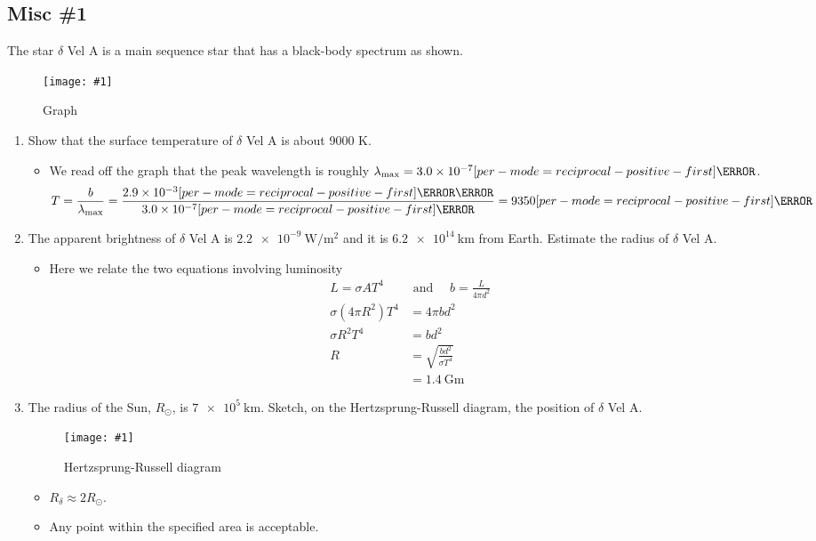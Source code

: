 \documentclass[a4paper,12pt]{article}
\let\oldsi\si
\renewcommand{\si}[1]{\oldsi[per-mode=reciprocal-positive-first]{#1}}
\newcommand{\img}[4]{\begin{center}
  \begin{figure}[H]
    \centering
    \texttt{[image: \#1]}
    \caption{#3}
    \label{fig:#4}
  \end{figure}
\end{center}}
\begin{document}
\pagebreak

\subsection{Misc \#1}

The star $\delta$ Vel A is a main sequence star that has a black-body spectrum as shown.

\img{ex/3.png}{0.9}{Graph}{ex3}

\begin{enumerate}[label=(\alph*)]
  \item Show that the surface temperature of $\delta$ Vel A is about 9000 K.
        \begin{itemize}
          \item We read off the graph that the peak wavelength is roughly $\lambda_{\max} = 3.0 \times 10^{-7} \si{\m}$.
                \begin{align*}
                  T = \frac{b}{\lambda_{\max}} = \frac{2.9 \times 10^{-3} \si{\m\kelvin}}{3.0 \times 10^{-7} \si{\m}} = 9350 \si{\kelvin}
                \end{align*}
        \end{itemize}
  \item The apparent brightness of $\delta$ Vel A is $\SI{2.2e-9}{\W\per\m\squared}$ and it is $\SI{6.2e14}{\km}$ from Earth. Estimate the radius of $\delta$ Vel A.

        \begin{itemize}
          \item Here we relate the two equations involving luminosity \begin{align*}
                  L = \sigma A T^4 \quad & \text{ and } \quad b = \frac{L}{4\pi d^2} \\
                  \sigma(4\pi R^2)T^4    & = 4\pi b d^2                              \\
                  \sigma R^2 T^4         & = bd^2                                    \\
                  R                      & = \sqrt{\frac{bd^2}{\sigma T^4}}          \\
                                         & = \SI{1.4}{\giga\m}
                \end{align*}
        \end{itemize}
  \item The radius of the Sun, $R_\odot$, is $\SI{7e5}{\km}$. Sketch, on the Hertzsprung-Russell diagram, the position of $\delta$ Vel A.
        \img{ex/4.png}{0.7}{Hertzsprung-Russell diagram}{ex4}
        \begin{itemize}
          \item $R_\delta \approx 2R_\odot$.
          \item Any point within the specified area is acceptable.
        \end{itemize}
\end{enumerate}
\end{document}
